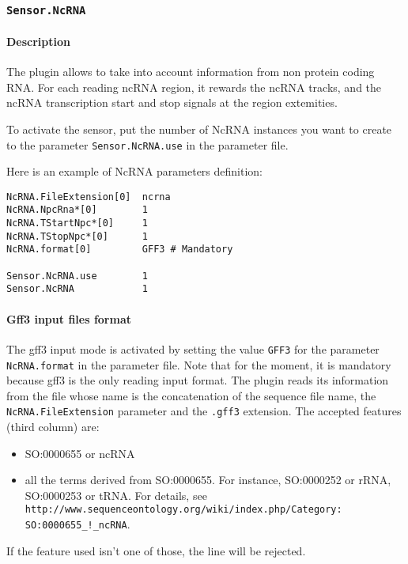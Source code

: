 
\subsubsection{\texttt{Sensor.NcRNA}}
\label{ncrna}
\paragraph{Description}

The plugin allows to take into account information from non protein coding RNA. 
For each reading ncRNA region, it rewards the ncRNA tracks, and the ncRNA transcription start and stop signals at the region extemities.

To activate the sensor, put the number of NcRNA instances you want to create to the parameter
\texttt{Sensor.NcRNA.use} in the parameter file.

Here is an example of NcRNA parameters definition:
\begin{Verbatim}[fontsize=\small]
NcRNA.FileExtension[0]  ncrna
NcRNA.NpcRna*[0]        1 
NcRNA.TStartNpc*[0]     1
NcRNA.TStopNpc*[0]      1	
NcRNA.format[0]         GFF3 # Mandatory

Sensor.NcRNA.use        1
Sensor.NcRNA            1
\end{Verbatim}


\paragraph{Gff3 input files format}

The gff3 input mode is activated by setting the value \texttt{GFF3}
for the parameter \texttt{NcRNA.format} in the parameter file.
Note that for the moment, it is mandatory because gff3 is the only reading input format.
The plugin reads its information from the file whose name is the concatenation
of the sequence file name, the \texttt{NcRNA.FileExtension} parameter 
and the \texttt{.gff3} extension.
The accepted features (third column) are:
\begin{itemize}
 \item SO:0000655 or ncRNA
 \item all the terms derived from SO:0000655. For instance, SO:0000252 or rRNA, SO:0000253 or tRNA. 
For details, see  \texttt{http://www.sequenceontology.org/wiki/index.php/Category:} \texttt{SO:0000655\_!\_ncRNA}.
\end{itemize}

If the feature used isn't one of those, the line will be rejected.


